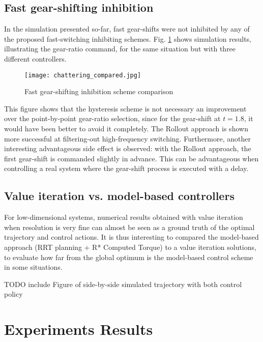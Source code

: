\subsection{Fast gear-shifting inhibition}

In the simulation presented so-far, fast gear-shifts were not inhibited by any of the proposed fast-switching inhibiting schemes. Fig. \ref{fig:ChatteringComparaison} shows simulation results, illustrating the gear-ratio command, for the same situation but with three different controllers. 
%
\begin{figure}[htp]
	\centering
		\texttt{[image: chattering\_compared.jpg]}
	\caption{Fast gear-shifting inhibition scheme comparison}
	\label{fig:ChatteringComparaison}
\end{figure}

This figure shows that the hysteresis scheme is not necessary an improvement over the point-by-point gear-ratio selection, since for the gear-shift at $t=1.8$, it would have been better to avoid it completely. The Rollout approach is shown more successful at filtering-out high-frequency switching. Furthermore, another interesting advantageous side effect is observed: with the Rollout approach, the first gear-shift is commanded slightly in advance. This can be advantageous when controlling a real system where the gear-shift process is executed with a delay. 

\subsection{Value iteration vs. model-based controllers}

For low-dimensional systems, numerical results obtained with value iteration when resolution is very fine can almost be seen as a ground truth of the optimal trajectory and control actions. It is thus interesting to compared the model-based approach (RRT planning + R* Computed Torque) to a value iteration solutions, to evaluate how far from the global optimum is the model-based control scheme in some situations.

TODO include Figure of side-by-side simulated trajectory with both control policy



\newpage
\section{Experiments Results}
\label{sec:shift_exp}

